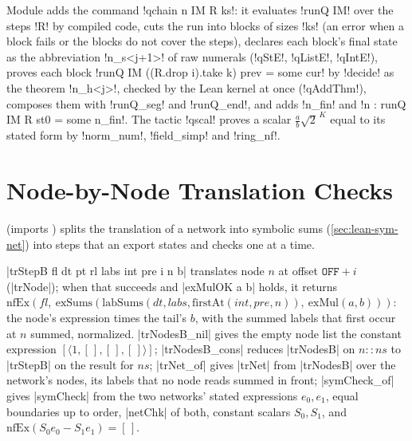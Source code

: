 Module  adds the command \lean!qchain n IM R ks!: it evaluates \lean!runQ IM! over the steps \lean!R! by compiled code, cuts the run into blocks of sizes \lean!ks! (an error when a block fails or the blocks do not cover the steps), declares each block's final state as the abbreviation \lean!n_s<j+1>! of raw numerals (\lean!qStE!, \lean!qListE!, \lean!qIntE!), proves each block \lean!runQ IM ((R.drop i).take k) prev = some cur! by \lean!decide! as the theorem \lean!n_h<j>!, checked by the Lean kernel at once (\lean!qAddThm!), composes them with \lean!runQ_seg! and \lean!runQ_end!, and adds \lean!n_fin! and \lean!n : runQ IM R st0 = some n_fin!. The tactic \lean!qscal! proves a scalar $\frac ab\sqrt2^{\,K}$ equal to its stated form by \lean!norm_num!, \lean!field_simp! and \lean!ring_nf!.

\section{Node-by-Node Translation Checks}\label{sec:lean-sym-chunk}

 (imports ) splits the translation of a network into symbolic sums (\cref{sec:lean-sym-net}) into steps that an export states and checks one at a time.

\begin{definition}\label{def:lean-sym-trstep}
\lean|trStepB fl dt pt rl labs int pre i n b| translates node $n$ at offset $\mathtt{OFF}+i$ (\lean|trNode|); when that succeeds and \lean|exMulOK a b| holds, it returns $\mathrm{nfEx}(fl,\ \mathrm{exSums}(\mathrm{labSums}(dt,labs,\mathrm{firstAt}(int,pre,n)),\ \mathrm{exMul}(a,b)))$: the node's expression times the tail's $b$, with the summed labels that first occur at $n$ summed, normalized. \lean|trNodesB_nil| gives the empty node list the constant expression $[\langle 1,[\,],[\,],[\,]\rangle]$; \lean|trNodesB_cons| reduces \lean|trNodesB| on $n::ns$ to \lean|trStepB| on the result for $ns$; \lean|trNet_of| gives \lean|trNet| from \lean|trNodesB| over the network's nodes, its labels that no node reads summed in front; \lean|symCheck_of| gives \lean|symCheck| from the two networks' stated expressions $e_0,e_1$, equal boundaries up to order, \lean|netChk| of both, constant scalars $S_0,S_1$, and $\mathrm{nfEx}(S_0e_0-S_1e_1)=[\,]$.
\end{definition}

